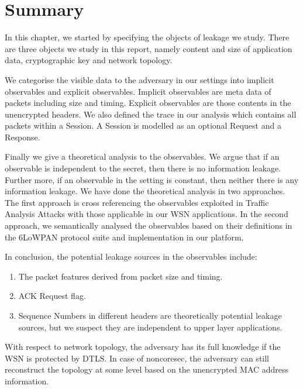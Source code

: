\section{Summary}

In this chapter, we started by specifying the objects of leakage we study. There are three objects we study in this report, namely content and size of application data, cryptographic key and network topology.

We categorise the visible data to the adversary in our settings into implicit observables and explicit observables. Implicit observables are meta data of packets including size and timing. Explicit observables are those contents in the unencrypted headers. We also defined the trace in our analysis which contains all packets within a Session. A Session is modelled as an optional Request and a Response.

Finally we give a theoretical analysis to the observables. We argue that if an observable is independent to the secret, then there is no information leakage. Further more, if an observable in the setting is constant, then neither there is any information leakage. We have done the theoretical analysis in two approaches. The first approach is cross referencing the observables exploited in Traffic Analysis Attacks with those applicable in our WSN applications. In the second approach, we semantically analysed the observables based on their definitions in the 6LoWPAN protocol suite and implementation in our platform. 

In conclusion, the potential leakage sources in the observables include:
\begin{enumerate}
	\item The packet features derived from packet size and timing.
	\item ACK Request flag.
	\item Sequence Numbers in different headers are theoretically potential leakage sources, but we suspect they are independent to upper layer applications.
\end{enumerate}

With respect to network topology, the adversary has its full knowledge if the WSN is protected by DTLS. In case of noncoresec, the adversary can still reconstruct the topology at some level based on the unencrypted MAC address information. 
